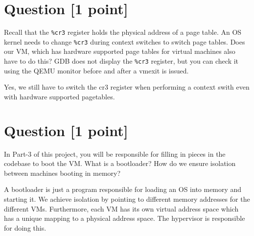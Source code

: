 \documentclass[11pt]{article}
\begin{document}
\section{Question [1 point]}

Recall that the \texttt{\%cr3} register holds the physical address of a page table. An OS kernel needs to change \texttt{\%cr3} during context switches to switch page tables. Does our VM, which has hardware supported page tables for virtual machines also have to do this? GDB does not display the \texttt{\%cr3} register, but you can check it using the QEMU monitor before and after a vmexit is issued.

\begin{solution}
Yes, we still have to switch the cr3 register when performing a context swith even with hardware supported pagetables. 
\end{solution}


\section{Question [1 point]}

In Part-3 of this project, you will be responsible for filling in pieces in the codebase to boot the VM. What is a bootloader? How do we ensure isolation between machines booting in memory?

\begin{solution}
A bootloader is just a program responsible for loading an OS into memory and starting it. We achieve isolation by pointing to different memory addresses for the different VMs. Furthermore, 
each VM has its own virtual address space which has a unique mapping to a physical address space. The hypervisor is responsible for doing this. 
\end{solution}
\end{document}
